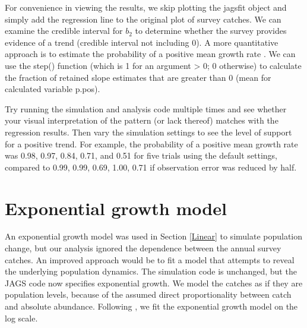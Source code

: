 \documentclass[
]{krantz}
\makeatletter
\newenvironment{Shaded}{\begin{snugshade}}{\end{snugshade}}
\newcommand{\AttributeTok}[1]{\textcolor[rgb]{0.27,0.27,0.27}{#1}}
\newcommand{\DecValTok}[1]{\textcolor[rgb]{0.06,0.06,0.06}{#1}}
\newcommand{\FunctionTok}[1]{\textcolor[rgb]{0.27,0.27,0.27}{\textbf{#1}}}
\newcommand{\NormalTok}[1]{#1}
\newcommand{\OtherTok}[1]{\textcolor[rgb]{0.37,0.37,0.37}{#1}}
\newcommand{\SpecialCharTok}[1]{\textcolor[rgb]{0.43,0.43,0.43}{\textbf{#1}}}
\newcommand{\StringTok}[1]{\textcolor[rgb]{0.5,0.5,0.5}{#1}}
\newenvironment{kframe}{%
\medskip{}
\setlength{\fboxsep}{.8em}
 \def\at@end@of@kframe{}%
 \ifinner\ifhmode%
  \def\at@end@of@kframe{\end{minipage}}%
  \begin{minipage}{\columnwidth}%
 \fi\fi%
 \def\FrameCommand##1{\hskip\@totalleftmargin \hskip-\fboxsep
 \colorbox{shadecolor}{##1}\hskip-\fboxsep
     \hskip-\linewidth \hskip-\@totalleftmargin \hskip\columnwidth}%
 \MakeFramed {\advance\hsize-\width
   \@totalleftmargin\z@ \linewidth\hsize
   \@setminipage}}%
 {\par\unskip\endMakeFramed%
 \at@end@of@kframe}
\renewenvironment{Shaded}{\begin{kframe}}{\end{kframe}}
\makeatother
\begin{document}
\begin{Shaded}
\end{Shaded}

For convenience in viewing the results, we skip plotting the jagsfit object and simply add the regression line to the original plot of survey catches. We can examine the credible interval for \(b_2\) to determine whether the survey provides evidence of a trend (credible interval not including 0). A more quantitative approach is to estimate the probability of a positive mean growth rate \citep{pregler.etal_2019}. We can use the step() function (which is 1 for an argument \textgreater{} 0; 0 otherwise) to calculate the fraction of retained slope estimates that are greater than 0 (mean for calculated variable p.pos).

Try running the simulation and analysis code multiple times and see whether your visual interpretation of the pattern (or lack thereof) matches with the regression results. Then vary the simulation settings to see the level of support for a positive trend. For example, the probability of a positive mean growth rate was 0.98, 0.97, 0.84, 0.71, and 0.51 for five trials using the default settings, compared to 0.99, 0.99, 0.69, 1.00, 0.71 if observation error was reduced by half.

\hypertarget{ExpGr}{%
\section{Exponential growth model}\label{ExpGr}}

An exponential growth model was used in Section \ref{Linear} to simulate population change, but our analysis ignored the dependence between the annual survey catches. An improved approach would be to fit a model that attempts to reveal the underlying population dynamics. The simulation code is unchanged, but the JAGS code now specifies exponential growth. We model the catches as if they are population levels, because of the assumed direct proportionality between catch and absolute abundance. Following \citet{kéry.schaub_2011}, we fit the exponential growth model on the log scale.
\end{document}
